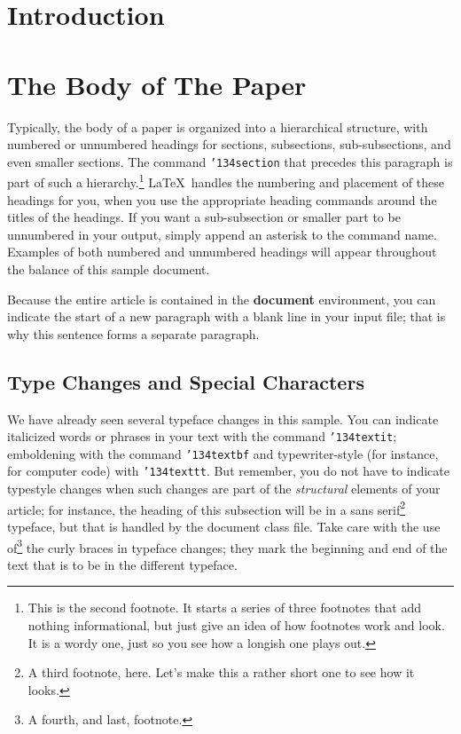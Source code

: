 \documentclass{sig-alternate-05-2015}
\begin{document}
	
	\section{Introduction}
	
	
	

	\section{The {\secit Body} of The Paper}
	Typically, the body of a paper is organized
	into a hierarchical structure, with numbered or unnumbered
	headings for sections, subsections, sub-subsections, and even
	smaller sections.  The command \texttt{{\char'134}section} that
	precedes this paragraph is part of such a
	hierarchy.\footnote{This is the second footnote.  It
		starts a series of three footnotes that add nothing
		informational, but just give an idea of how footnotes work
		and look. It is a wordy one, just so you see
		how a longish one plays out.} \LaTeX\ handles the numbering
	and placement of these headings for you, when you use
	the appropriate heading commands around the titles
	of the headings.  If you want a sub-subsection or
	smaller part to be unnumbered in your output, simply append an
	asterisk to the command name.  Examples of both
	numbered and unnumbered headings will appear throughout the
	balance of this sample document.
	
	Because the entire article is contained in
	the \textbf{document} environment, you can indicate the
	start of a new paragraph with a blank line in your
	input file; that is why this sentence forms a separate paragraph.
	
	\subsection{Type Changes and {\subsecit Special} Characters}
	We have already seen several typeface changes in this sample.  You
	can indicate italicized words or phrases in your text with
	the command \texttt{{\char'134}textit}; emboldening with the
	command \texttt{{\char'134}textbf}
	and typewriter-style (for instance, for computer code) with
	\texttt{{\char'134}texttt}.  But remember, you do not
	have to indicate typestyle changes when such changes are
	part of the \textit{structural} elements of your
	article; for instance, the heading of this subsection will
	be in a sans serif\footnote{A third footnote, here.
		Let's make this a rather short one to
		see how it looks.} typeface, but that is handled by the
	document class file. Take care with the use
	of\footnote{A fourth, and last, footnote.}
	the curly braces in typeface changes; they mark
	the beginning and end of
	the text that is to be in the different typeface.
	
\end{document}
